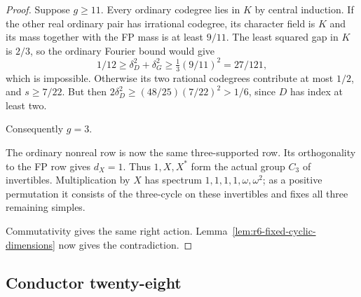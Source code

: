 \documentclass[11pt,reqno]{amsart}
\theoremstyle{remark}\newtheorem{remark}[theorem]{Remark}
\numberwithin{equation}{section}
\begin{document}
\begin{proof}
Suppose $g\ge11$.
Every ordinary codegree lies in $K$ by central induction.
If the other real ordinary pair has irrational codegree, its
character field is $K$ and its mass together with the FP mass
is at least $9/11$.
The least squared gap in $K$ is $2/3$, so the ordinary Fourier
bound would give
\[
 1/12\ge\delta_D^2+\delta_G^2
 \ge\tfrac13(9/11)^2=27/121,
\]
which is impossible.
Otherwise its two rational codegrees contribute at most $1/2$,
and $s\ge7/22$.
But then $2\delta_D^2\ge(48/25)(7/22)^2>1/6$,
since $D$ has index at least two.

Consequently $g=3$.

The ordinary nonreal row is now the same three-supported row.
Its orthogonality to the FP row gives $d_X=1$.
Thus $1,X,X^*$ form the actual group $C_3$ of invertibles.
Multiplication by $X$ has spectrum $1,1,1,1,\omega,\omega^2$;
as a positive permutation it consists of the three-cycle on
these invertibles and fixes all three remaining simples.

Commutativity gives the same right action. Lemma~\ref{lem:r6-fixed-cyclic-dimensions}
now gives the contradiction.
\end{proof}

\subsection{Conductor twenty-eight}
\end{document}
